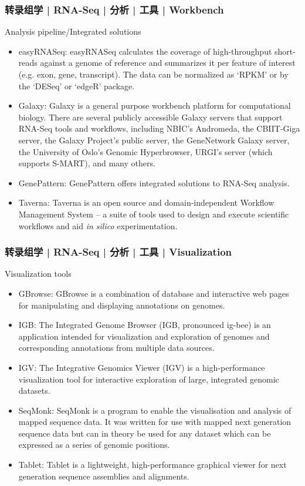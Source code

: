 \begin{frame}
  \frametitle{转录组学 | RNA-Seq | 分析 | 工具 | Workbench}
  {\footnotesize
  \begin{block}{Analysis pipeline/Integrated solutions}
    \begin{itemize}
      \item easyRNASeq: easyRNASeq calculates the coverage of high-throughput short-reads against a genome of reference and summarizes it per feature of interest (e.g. exon, gene, transcript). The data can be normalized as `RPKM' or by the `DESeq' or `edgeR' package.
      \item Galaxy: Galaxy is a general purpose workbench platform for computational biology. There are several publicly accessible Galaxy servers that support RNA-Seq tools and workflows, including NBIC's Andromeda, the CBIIT-Giga server, the Galaxy Project's public server, the GeneNetwork Galaxy server, the University of Oslo's Genomic Hyperbrowser, URGI's server (which supports S-MART), and many others.
      \item GenePattern: GenePattern offers integrated solutions to RNA-Seq analysis.
      \item Taverna: Taverna is an open source and domain-independent Workflow Management System – a suite of tools used to design and execute scientific workflows and aid \textit{in silico} experimentation.
    \end{itemize}
  \end{block}
  }
\end{frame}

\begin{frame}
  \frametitle{转录组学 | RNA-Seq | 分析 | 工具 | Visualization}
  {\footnotesize
  \begin{block}{Visualization tools}
    \begin{itemize}
      \item GBrowse: GBrowse is a combination of database and interactive web pages for manipulating and displaying annotations on genomes.
      \item IGB: The Integrated Genome Browser (IGB, pronounced ig-bee) is an application intended for visualization and exploration of genomes and corresponding annotations from multiple data sources. 
      \item IGV: The Integrative Genomics Viewer (IGV) is a high-performance visualization tool for interactive exploration of large, integrated genomic datasets.
      \item SeqMonk: SeqMonk is a program to enable the visualisation and analysis of mapped sequence data. It was written for use with mapped next generation sequence data but can in theory be used for any dataset which can be expressed as a series of genomic positions.
      \item Tablet: Tablet is a lightweight, high-performance graphical viewer for next generation sequence assemblies and alignments.
    \end{itemize}
  \end{block}
  }
\end{frame}

